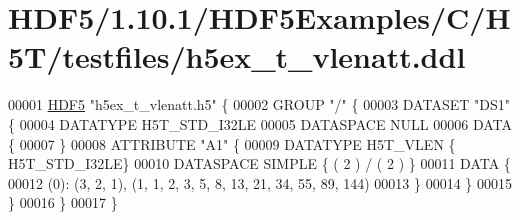 \hypertarget{_h_d_f5_21_810_81_2_h_d_f5_examples_2_c_2_h5_t_2testfiles_2h5ex__t__vlenatt_8ddl_source}{}\section{H\+D\+F5/1.10.1/\+H\+D\+F5\+Examples/\+C/\+H5\+T/testfiles/h5ex\+\_\+t\+\_\+vlenatt.ddl}
\label{_h_d_f5_21_810_81_2_h_d_f5_examples_2_c_2_h5_t_2testfiles_2h5ex__t__vlenatt_8ddl_source}

\begin{DoxyCode}
00001 \hyperlink{namespace_h_d_f5}{HDF5} \textcolor{stringliteral}{"h5ex\_t\_vlenatt.h5"} \{
00002 GROUP \textcolor{stringliteral}{"/"} \{
00003    DATASET \textcolor{stringliteral}{"DS1"} \{
00004       DATATYPE  H5T\_STD\_I32LE
00005       DATASPACE  NULL
00006       DATA \{
00007       \}
00008       ATTRIBUTE \textcolor{stringliteral}{"A1"} \{
00009          DATATYPE  H5T\_VLEN \{ H5T\_STD\_I32LE\}
00010          DATASPACE  SIMPLE \{ ( 2 ) / ( 2 ) \}
00011          DATA \{
00012          (0): (3, 2, 1), (1, 1, 2, 3, 5, 8, 13, 21, 34, 55, 89, 144)
00013          \}
00014       \}
00015    \}
00016 \}
00017 \}
\end{DoxyCode}
